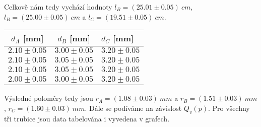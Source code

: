 \documentclass[a4paper]{article}
\begin{document}
\par Celkově nám tedy vychází hodnoty $l_{B} = (25.01\pm0.05)\: cm$, $l_{B} = (25.00\pm0.05)\: cm$ a $l_{C} = (19.51\pm0.05)\: cm$.
\begin{center}
    \label{tab:title}
    \begin{tabular}{ | c | c |  p{3cm} |} \hline
    $d_{A}$ [mm] & $d_{B}$ [mm] & $d_{C}$ [mm]   \\ \hline
    $2.10\pm0.05$ & $3.00\pm0.05$ & $3.20\pm0.05$ \\ \hline
    $2.10\pm0.05$ & $3.05\pm0.05$ & $3.20\pm0.05$ \\ \hline
    $2.10\pm0.05$ & $3.05\pm0.05$ & $3.20\pm0.05$ \\ \hline
    $2.00\pm0.05$ & $3.00\pm0.05$ & $3.20\pm0.05$  \\ \hline
    \end{tabular}
\end{center}
\par Výsledné poloměry tedy jsou $r_{A} = (1.08\pm0.03)\: mm$ a $r_{B} = (1.51\pm0.03)\: mm$, $r_{C} = (1.60\pm0.03)\: mm$. Dále se podíváme na závislost $Q_{v}(p)$. Pro všechny tři trubice jsou data tabelována i vyvedena v grafech.
\newpage
\end{document}

